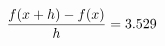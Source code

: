 \documentclass[preview]{standalone}
\begin{document}
\begin{align*}
\special{dvisvgm:raw <g id='unique000'>}\frac{f(x+h)-f(x)}{h} = 3.529\special{dvisvgm:raw </g>}
\end{align*}
\end{document}
